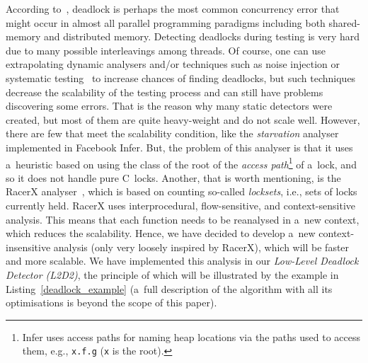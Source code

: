 \documentclass{ExcelAtFIT}
\begin{document}
According to~\cite{dogru2011modern}, deadlock is perhaps the most common concurrency error that might occur in almost all parallel programming paradigms including both shared-memory and distributed memory. Detecting deadlocks during testing is very hard due to many possible interleavings among threads. Of course, one can use extrapolating dynamic analysers and/or techniques such as noise injection or systematic testing~\cite{conErrors} to increase chances of finding deadlocks, but such techniques decrease the scalability of the testing process and can still have problems discovering some errors. That is the reason why many static detectors were created, but most of them are quite heavy-weight and do not scale well. However, there are few that meet the scalability condition, like the \textit{starvation} analyser implemented in Facebook Infer. But, the problem of this analyser is that it uses a~heuristic based on using the class of the root of the \emph{access path}\footnote{Infer uses access paths for naming heap locations via the paths used to access them, e.g., \texttt{x.f.g} (\texttt{x} is the root).} of a~lock, and so it does not handle pure C~locks. Another, that is worth mentioning, is the RacerX analyser~\cite{racerx}, which is based on counting so-called \textit{locksets}, i.e., sets of locks currently held. RacerX uses interprocedural, flow-sensitive, and context-sensitive analysis. This means that each function needs to be reanalysed in a~new context, which reduces the scalability. Hence, we have decided to develop a~new context-insensitive analysis (only very loosely inspired by RacerX), which will be faster and more scalable. We have implemented this analysis in our \textit{Low-Level Deadlock Detector (L2D2)}, the principle of which will be illustrated by the example in Listing~\ref{deadlock_example} (a~full description of the algorithm with all its optimisations is beyond the scope of this paper).
\end{document}
